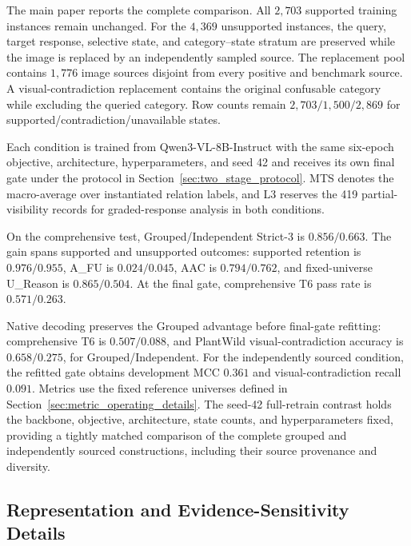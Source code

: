 \documentclass[letterpaper]{article}
\begin{document}
The main paper reports the complete comparison. All $2{,}703$ supported training instances remain unchanged. For the $4{,}369$ unsupported instances, the query, target response, selective state, and category--state stratum are preserved while the image is replaced by an independently sampled source. The replacement pool contains $1{,}776$ image sources disjoint from every positive and benchmark source. A visual-contradiction replacement contains the original confusable category while excluding the queried category. Row counts remain $2{,}703/1{,}500/2{,}869$ for supported/contradiction/unavailable states.

Each condition is trained from Qwen3-VL-8B-Instruct with the same six-epoch objective, architecture, hyperparameters, and seed 42 and receives its own final gate under the protocol in Section~\ref{sec:two_stage_protocol}. MTS denotes the macro-average over instantiated relation labels, and L3 reserves the 419 partial-visibility records for graded-response analysis in both conditions.

On the comprehensive test, Grouped/Independent Strict-3 is $0.856/0.663$. The gain spans supported and unsupported outcomes: supported retention is $0.976/0.955$, A\_FU is $0.024/0.045$, AAC is $0.794/0.762$, and fixed-universe U\_Reason is $0.865/0.504$. At the final gate, comprehensive T6 pass rate is $0.571/0.263$.

Native decoding preserves the Grouped advantage before final-gate refitting:
comprehensive T6 is $0.507/0.088$, and PlantWild visual-contradiction accuracy is
$0.658/0.275$, for Grouped/Independent. For the independently sourced condition, the refitted gate obtains
development MCC $0.361$ and visual-contradiction recall $0.091$. Metrics use the
fixed reference universes defined in
Section~\ref{sec:metric_operating_details}. The seed-42
full-retrain contrast holds the backbone, objective, architecture, state counts,
and hyperparameters fixed, providing a tightly matched comparison of the
complete grouped and independently sourced constructions, including their
source provenance and diversity.

\subsection{Representation and Evidence-Sensitivity Details}
\label{sec:representation_evidence_details}
\end{document}
